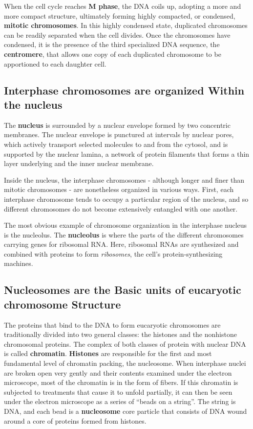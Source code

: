 When the cell cycle reaches \textbf{M phase}, the DNA coils up, adopting a more
and more compact structure, ultimately forming highly compacted, or
condensed, \textbf{mitotic chromosomes}. In this highly condensed state, duplicated
chromosomes can be readily separated when the cell divides.
Once the chromosomes have condensed, it is the presence of the
third specialized DNA sequence, the \textbf{centromere}, that allows one copy
of each duplicated chromosome to be apportioned to each daughter cell.

\subsection{Interphase chromosomes are organized Within the nucleus}

The \textbf{nucleus} is surrounded by a nuclear envelope formed by two concentric
membranes. The nuclear envelope is punctured at intervals by
nuclear pores, which actively transport selected molecules to and from
the cytosol, and is supported by the
nuclear lamina, a network of protein filaments that forms a thin layer
underlying and the inner nuclear membrane.

Inside the nucleus, the interphase chromosomes - although longer and
finer than mitotic chromosomes - are nonetheless organized in various
ways. First, each interphase chromosome tends to occupy a particular
region of the nucleus, and so different chromosomes do not become
extensively entangled with one another.

The most obvious example of chromosome organization in the interphase
nucleus is the nucleolus. The \textbf{nucleolus} is where the
parts of the different chromosomes carrying genes for ribosomal RNA.
Here, ribosomal RNAs are synthesized and combined with proteins to
form \textit{ribosomes}, the cell’s protein-synthesizing machines.

\subsection{Nucleosomes are the Basic units of eucaryotic chromosome Structure}

The proteins that bind to the DNA to form eucaryotic chromosomes
are traditionally divided into two general classes: the histones and the
nonhistone chromosomal proteins.
The complex of both classes of protein with nuclear DNA is called \textbf{chromatin}.
\textbf{Histones} are responsible for the first and most fundamental level of chromatin
packing, the nucleosome. When interphase nuclei are broken open very gently
and their contents examined under the electron microscope, most of the chromatin is in the form
of fibers. If this chromatin is subjected
to treatments that cause it to unfold partially, it can
then be seen under the electron microscope as a series of “beads on
a string”. The string is DNA, and each bead is a \textbf{nucleosome}
core particle that consists of DNA wound around a core of proteins formed from histones.

